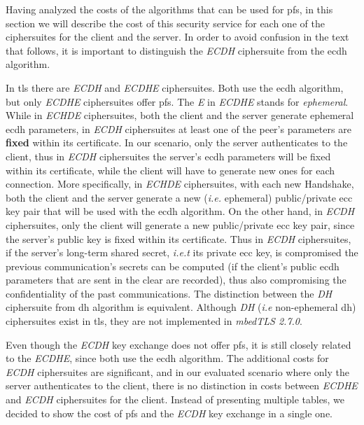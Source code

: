 \documentclass{llncs}
\begin{document}
Having analyzed the costs of the algorithms that can be used for \gls{pfs}, in this section we will describe the cost of this security service
for each one of the ciphersuites for the client and the server. In order to avoid confusion in the text that follows, it is important to
distinguish the \textit{ECDH} ciphersuite from the \gls{ecdh} algorithm.

In \gls{tls} there are \textit{ECDH} and \textit{ECDHE} ciphersuites. Both use the \gls{ecdh} algorithm, but only \textit{ECDHE} ciphersuites
offer \gls{pfs}. The \textit{E} in \textit{ECDHE} stands for \textit{ephemeral}. While in \textit{ECHDE} ciphersuites, both the client and the server
generate ephemeral \gls{ecdh} parameters, in \textit{ECDH} ciphersuites at least one of the peer's parameters are \textbf{fixed}
within its certificate. In our scenario, only the server authenticates to the client, thus in \textit{ECDH} ciphersuites the server's
\gls{ecdh} parameters will be fixed within its certificate, while the client will have to generate new ones for each connection.
More specifically, in \textit{ECHDE} ciphersuites, with each  new Handshake, both the client and the server generate a new (\textit{i.e.} ephemeral)
public/private \gls{ecc} key pair that will be used with the \gls{ecdh} algorithm. On the other hand, in \textit{ECDH} ciphersuites, only the client
will generate a new public/private \gls{ecc} key pair, since the server's public key is fixed within its certificate. Thus in \textit{ECDH}
ciphersuites, if the server's long-term shared secret, \textit{i.e.t} its private \gls{ecc} key, is compromised the previous communication's secrets
can be computed (if the client's public \gls{ecdh} parameters that are sent in the clear are recorded), thus also compromising the confidentiality of
the past communications. The distinction between the \textit{DH} ciphersuite from \gls{dh} algorithm is equivalent. Although \textit{DH} (\textit{i.e}
non-ephemeral \gls{dh}) ciphersuites exist in \gls{tls}, they are not implemented in \textit{mbedTLS 2.7.0}.

Even though the \textit{ECDH} key exchange does not offer \gls{pfs}, it is still closely related to the \textit{ECDHE}, since both use
the \gls{ecdh} algorithm. The additional costs for \textit{ECDH} ciphersuites are significant, and in our evaluated scenario where only the server
authenticates to the client, there is no distinction in costs between \textit{ECDHE} and \textit{ECDH} ciphersuites for the client. Instead of
presenting multiple tables, we decided to show the cost of \gls{pfs} and the \textit{ECDH} key exchange in a single one.
\end{document}
